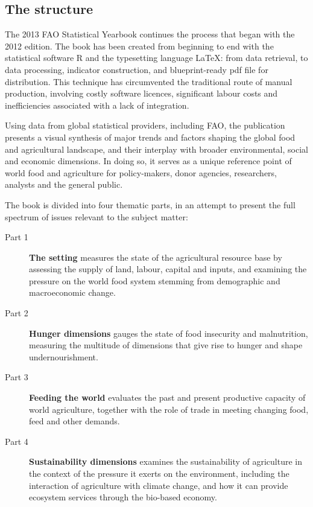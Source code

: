 

\subsection{The structure}

The 2013 FAO Statistical Yearbook continues the process that began with the 2012 edition. The book has been created from beginning to end with the statistical software R and the typesetting language \LaTeX: from data retrieval, to data processing, indicator construction, and blueprint-ready pdf file for distribution. This technique has circumvented the traditional route of manual production, involving costly software licences, significant labour costs and inefficiencies associated with a lack of integration.  

Using data from global statistical providers, including FAO, the publication presents a visual synthesis of  major trends and factors shaping the global food and agricultural landscape, and their interplay with broader environmental, social and economic dimensions. In doing so, it serves as a unique reference point of world food and agriculture for policy-makers, donor agencies, researchers,  analysts and the general public.

The book is divided into four thematic parts, in an attempt to present the full spectrum of issues relevant to the subject matter:

\begin{description}
\item[Part 1] {\textbf{\color{part1}The setting}} measures the state of the agricultural resource base by assessing the supply of land, labour, capital and inputs, and examining the pressure on the world food system stemming from demographic and macroeconomic change.
\item[Part 2] {\textbf{\color{part2}Hunger dimensions}} gauges the state of food insecurity and malnutrition, measuring the multitude of dimensions that give rise to hunger and shape undernourishment.
\item[Part 3] {\textbf{\color{part3}Feeding the world}} evaluates the past and present productive capacity of world agriculture, together with the role of trade in meeting changing food, feed and other demands.
\item[Part 4] {\textbf{\color{part4}Sustainability dimensions}} examines the sustainability of agriculture in the context of the pressure it exerts on the environment, including the interaction of agriculture with climate change,  and how it can provide ecosystem services through the bio-based economy.
\end{description}

